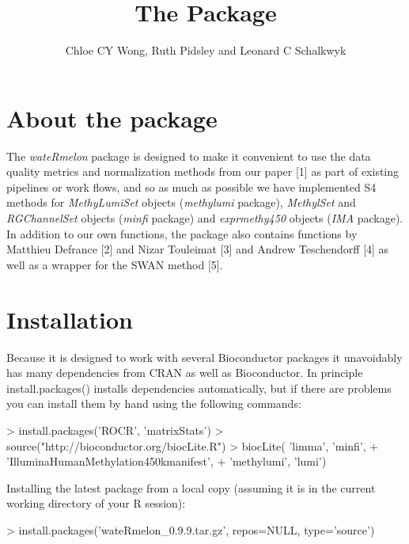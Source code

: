 \documentclass[11pt]{article}
\title{The \Rpackage{wateRmelon} Package}
\author{Chloe CY Wong, Ruth Pidsley and Leonard C Schalkwyk}
\newcommand{\Rpackage}[1]{{\textit{#1}}}
\newcommand{\Rclass}[1]{{\textit{#1}}}
\begin{document}
 
\maketitle
\section{ About the package } 
The \Rpackage{wateRmelon} package is designed to make it convenient to use 
the data quality metrics and normalization methods from our paper [1] as part 
of existing pipelines or work flows, and so as much as possible we have 
implemented S4 methods for \Rclass{MethyLumiSet} objects (\Rpackage{methylumi}
 package), \Rclass{MethylSet} and \Rclass{RGChannelSet} objects (\Rpackage{minfi} package) and \Rclass{exprmethy450} objects (\Rpackage{IMA} 
package).\\

In addition to our own functions, the package also contains functions by 
Matthieu Defrance [2] and Nizar Touleimat [3] and Andrew Teschendorff [4] 
as well as a wrapper for the SWAN method [5].

\section{Installation}
Because it is designed to work with several Bioconductor packages it unavoidably 
has many dependencies from CRAN as well as Bioconductor. In principle 
install.packages() installs dependencies automatically, but if there are problems 
you can install them by hand using the following commands:
 
\begin{Schunk}
\begin{Sinput}
> install.packages('ROCR', 'matrixStats')
> source("http://bioconductor.org/biocLite.R")
> biocLite( 'limma', 'minfi', 
+    'IlluminaHumanMethylation450kmanifest', 
+    'methylumi', 'lumi')
\end{Sinput}
\end{Schunk}


Installing the latest package from a local copy (assuming it is in the current working 
directory of your R session):

\begin{Schunk}
\begin{Sinput}
> install.packages('wateRmelon_0.9.9.tar.gz', repos=NULL, type='source')
\end{Sinput}
\end{Schunk}
\end{document}
